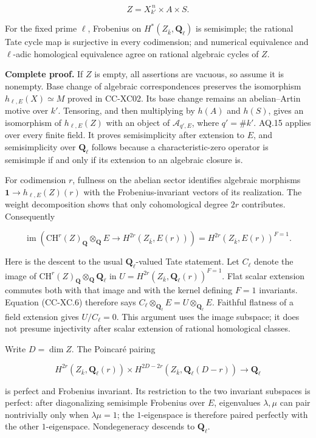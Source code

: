 \documentclass[11pt,a4paper]{article}
\theoremstyle{definition}\newtheorem{definition}[theorem]{Definition}
\theoremstyle{remark}\newtheorem{remark}[theorem]{Remark}
\begin{document}
\[
 Z=X_{k'}^{\,n}\times A\times S.
\]

For the fixed prime \(\ell\), Frobenius on
\(H^*(Z_{\bar k},\mathbf Q_\ell)\) is semisimple; the rational Tate
cycle map is surjective in every codimension; and numerical equivalence
and \(\ell\)-adic homological equivalence agree on rational algebraic
cycles of \(Z\).

\textbf{Complete proof.} If \(Z\) is empty, all assertions are vacuous,
so assume it is nonempty. Base change of algebraic correspondences
preserves the isomorphism \(h_{\ell,E}(X)\simeq M\) proved in CC-XC02.
Its base change remains an abelian--Artin motive over \(k'\). Tensoring,
and then multiplying by \(h(A)\) and \(h(S)\), gives an isomorphism of
\(h_{\ell,E}(Z)\) with an object of \(\mathcal A_{q',E}\), where
\(q'=\#k'\). AQ.15 applies over every finite field. It proves
semisimplicity after extension to \(E\), and semisimplicity over
\(\mathbf Q_\ell\) follows because a characteristic-zero operator is
semisimple if and only if its extension to an algebraic closure is.

For codimension \(r\), fullness on the abelian sector identifies
algebraic morphisms \(\mathbf 1\to h_{\ell,E}(Z)(r)\) with the
Frobenius-invariant vectors of its realization. The weight decomposition
shows that only cohomological degree \(2r\) contributes. Consequently

\[
 \operatorname{im}\!\left(
 \mathrm{CH}^r(Z)_{\mathbf Q}\otimes_{\mathbf Q}E
 \longrightarrow H^{2r}(Z_{\bar k},E(r))
 \right)
 =H^{2r}(Z_{\bar k},E(r))^{F=1}.                 \tag{CC-XC.6}
\]

Here is the descent to the usual \(\mathbf Q_\ell\)-valued Tate
statement. Let \(C_\ell\) denote the image of
\(\mathrm{CH}^r(Z)_{\mathbf Q}\otimes_{\mathbf Q}\mathbf Q_\ell\) in
\(U=H^{2r}(Z_{\bar k},\mathbf Q_\ell(r))^{F=1}\). Flat scalar extension
commutes both with that image and with the kernel defining \(F=1\)
invariants. Equation (CC-XC.6) therefore says
\(C_\ell\otimes_{\mathbf Q_\ell}E=U\otimes_{\mathbf Q_\ell}E\). Faithful
flatness of a field extension gives \(U/C_\ell=0\). This argument uses
the image subspace; it does not presume injectivity after scalar
extension of rational homological classes.

Write \(D=\dim Z\). The Poincaré pairing

\[
 H^{2r}(Z_{\bar k},\mathbf Q_\ell(r))
 \times
 H^{2D-2r}(Z_{\bar k},\mathbf Q_\ell(D-r))
 \longrightarrow\mathbf Q_\ell
\]

is perfect and Frobenius invariant. Its restriction to the two invariant
subspaces is perfect: after diagonalizing semisimple Frobenius over
\(E\), eigenvalues \(\lambda,\mu\) can pair nontrivially only when
\(\lambda\mu=1\); the \(1\)-eigenspace is therefore paired perfectly
with the other \(1\)-eigenspace. Nondegeneracy descends to
\(\mathbf Q_\ell\).
\end{document}

